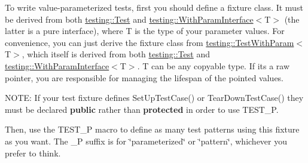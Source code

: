 To write value-\/parameterized tests, first you should define a fixture class. It must be derived from both {\ttfamily \mbox{\hyperlink{classtesting_1_1Test}{testing\+::\+Test}}} and {\ttfamily \mbox{\hyperlink{classtesting_1_1WithParamInterface}{testing\+::\+With\+Param\+Interface}}$<$T$>$} (the latter is a pure interface), where {\ttfamily T} is the type of your parameter values. For convenience, you can just derive the fixture class from {\ttfamily \mbox{\hyperlink{classtesting_1_1TestWithParam}{testing\+::\+Test\+With\+Param}}$<$T$>$}, which itself is derived from both {\ttfamily \mbox{\hyperlink{classtesting_1_1Test}{testing\+::\+Test}}} and {\ttfamily \mbox{\hyperlink{classtesting_1_1WithParamInterface}{testing\+::\+With\+Param\+Interface}}$<$T$>$}. {\ttfamily T} can be any copyable type. If it\textquotesingle{}s a raw pointer, you are responsible for managing the lifespan of the pointed values.

N\+O\+TE\+: If your test fixture defines {\ttfamily Set\+Up\+Test\+Case()} or {\ttfamily Tear\+Down\+Test\+Case()} they must be declared {\bfseries{public}} rather than {\bfseries{protected}} in order to use {\ttfamily T\+E\+S\+T\+\_\+P}.


\begin{DoxyCode}{0}
\DoxyCodeLine{\};}
\DoxyCodeLine{}
\DoxyCodeLine{\};}
\DoxyCodeLine{\};}
\end{DoxyCode}


Then, use the {\ttfamily T\+E\+S\+T\+\_\+P} macro to define as many test patterns using this fixture as you want. The {\ttfamily \+\_\+P} suffix is for \char`\"{}parameterized\char`\"{} or \char`\"{}pattern\char`\"{}, whichever you prefer to think.


\begin{DoxyCode}{0}
\DoxyCodeLine{\}}
\DoxyCodeLine{}
\DoxyCodeLine{\}}
\end{DoxyCode}


